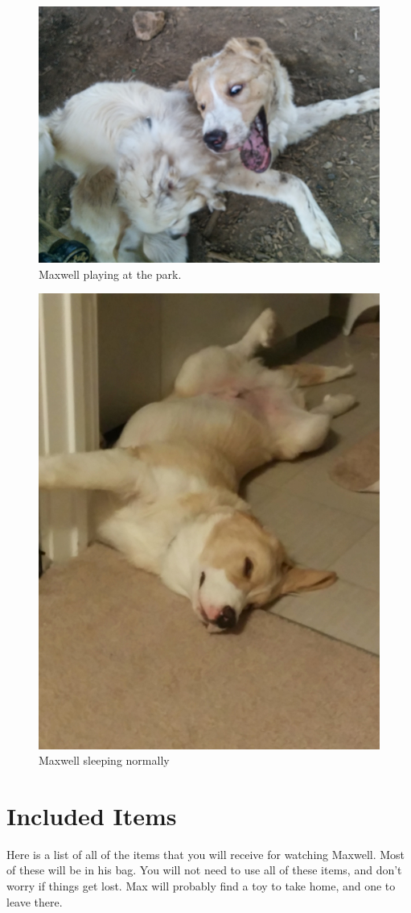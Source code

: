 \documentclass[pdftex,12pt]{article}
\begin{document}
\clearpage

\vspace*{\fill}

\begin{figure}[h!]
    \centering
    \includegraphics[width=.35\textwidth]{./images/max/at_the_park.jpg}
    \caption*{Maxwell playing at the park.}\label{fig:at_the_park}
\end{figure}

\bigskip

\begin{figure}[h!]\label{fig:sleeping}
    \centering
    \includegraphics[width=.35\textwidth]{./images/max/sleeping.jpg}
    \caption*{Maxwell sleeping normally}
\end{figure}

\vspace*{\fill}

\clearpage
\newpage
\section{Included Items}

Here is a list of all of the items that you will receive for watching Maxwell.
Most of these will be in his bag.
You will not need to use all of these items, and don't worry if things get lost.
Max will probably find a toy to take home, and one to leave there.
\end{document}
